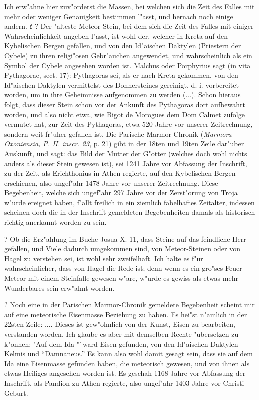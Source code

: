 \documentclass[a4paper, 11pt, oneside, polutonikogreek, german]{article}
\begin{document}
Ich erw"ahne hier zuv"orderst die Massen, bei welchen sich die Zeit des Falles mit mehr oder weniger Genauigkeit bestimmen l"asst, und hernach noch einige andern.
ἐ
? Der "alteste Meteor-Stein, bei dem sich die Zeit des Falles mit einiger Wahrscheinlichkeit angeben l"asst, ist wohl der, welcher in Kreta auf den Kybelischen Bergen gefallen, und von den Id"aischen Daktylen (Priestern der Cybele) zu ihren religi"osen Gebr"auchen angewendet, und wahrscheinlich als ein Symbol der Cybele angesehen worden ist. Malchus oder Porphyrius sagt (in vita Pythagorae, sect. 17): Pythagoras sei, als er nach Kreta gekommen, von den Id"aischen Daktylen vermittelst des Donnersteines gereinigt, d. i. vorbereitet worden, um in ihre Geheimnisse aufgenommen zu werden (...). Schon hieraus folgt, dass dieser Stein schon vor der Ankunft des Pythagoras dort aufbewahrt worden, und also nicht etwa, wie Bigot de Morogues dem Dom Calmet zufolge vermutet hat, zur Zeit des Pythagoras, etwa 520 Jahre vor unserer Zeitrechnung, sondern weit fr"uher gefallen ist. Die Parische Marmor-Chronik (\emph{Marmora Oxoniensia, P. II. inscr. 23}, p. 21) gibt in der 18ten und 19ten Zeile dar"uber Auskunft, und sagt: das Bild der Mutter der G"otter (welches doch wohl nichts anders als dieser Stein gewesen ist), sei 1241 Jahre vor Abfassung der Inschrift, zu der Zeit, als Erichthonius in Athen regierte, auf den Kybelischen Bergen erschienen, also ungef"ahr 1478 Jahre vor unserer Zeitrechnung. Diese Begebenheit, welche sich ungef"ahr 297 Jahre vor der Zerst"orung von Troja w"urde ereignet haben, f"allt freilich in ein ziemlich fabelhaftes Zeitalter, indessen scheinen doch die in der Inschrift gemeldeten Begebenheiten damals als historisch richtig anerkannt worden zu sein.

? Ob die Erz"ahlung im Buche Josua X. 11, dass Steine auf das feindliche Herr gefallen, und Viele dadurch umgekommen sind, von Meteor-Steinen oder von Hagel zu verstehen sei, ist wohl sehr zweifelhaft. Ich halte es f"ur wahrscheinlicher, dass von Hagel die Rede ist; denn wenn es ein gro"ses Feuer-Meteor mit einem Steinfalle gewesen w"are, w"urde es gewiss als etwas mehr Wunderbares sein erw"ahnt worden.

? Noch eine in der Parischen Marmor-Chronik gemeldete Begebenheit scheint mir auf eine meteorische Eisenmasse Beziehung zu haben. Es hei"st n"amlich in der 22sten Zeile: .... Dieses ist gew"ohnlich von der Kunst, Eisen zu bearbeiten, verstanden worden. Ich glaube es aber mit demselben Rechte "ubersetzen zu k"onnen: "Auf dem Ida "`ward Eisen gefunden, von den Id"aischen Daktylen Kelmis und "`Damnaneus."' Es kann also wohl damit gesagt sein, dass sie auf dem Ida eine Eisenmasse gefunden haben, die meteorisch gewesen, und von ihnen als etwas Heiliges angesehen worden ist. Es geschah 1168 Jahre vor Abfassung der Inschrift, als Pandion zu Athen regierte, also ungef"ahr 1403 Jahre vor Christi Geburt.
\end{document}

